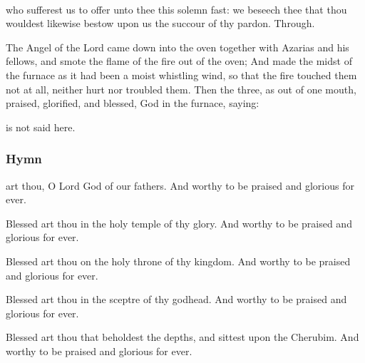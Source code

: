 \\


\collect
{} who sufferest us to offer unto thee this solemn fast: we beseech thee that thou wouldest likewise bestow upon us the succour of thy pardon. Through.

\clearpage
{}
 The Angel of the Lord came down into the oven together with Azarias and his fellows, and smote the flame of the fire out of the oven; And made the midst of the furnace as it had been a moist whistling wind, so that the fire touched them not at all, neither hurt nor troubled them. Then the three, as out of one mouth, praised, glorified, and blessed, God in the furnace, saying:

\begin{rubric}
     is not said here.
\end{rubric}

\vspace{-0.25\baselineskip}

\subsubsection{Hymn}

\vspace{-0.1\baselineskip}

 art thou, O Lord God of our fathers. And worthy to be praised and glorious for ever.


Blessed art thou in the holy temple of thy glory. And worthy to be praised and glorious for ever.

Blessed art thou on the holy throne of thy kingdom. And worthy to be praised and glorious for ever.

Blessed art thou in the sceptre of thy godhead. And worthy to be praised and glorious for ever.

Blessed art thou that beholdest the depths, and sittest upon the Cherubim. And worthy to be praised and glorious for ever.

